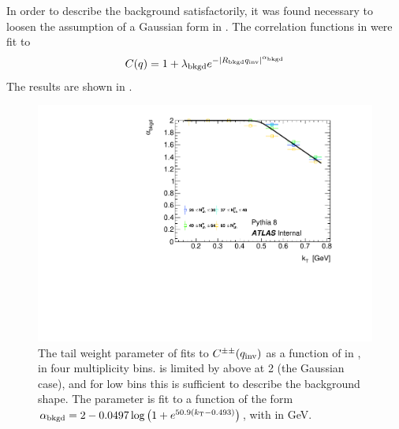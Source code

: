 In order to describe the background satisfactorily, it was found necessary to loosen the assumption of a Gaussian form in \qinv.
The \qinv correlation functions in  were fit to
\begin{equation} C(q) = 1 + \lambda_{\mathrm{bkgd}} e^{-|R_{\mathrm{bkgd}} q_{\mathrm{inv}}|^{\alpha_{\mathrm{bkgd}}}} \end{equation}
The results are shown in .

\begin{figure}[t]
\begin{minipage}[t]{1.0\textwidth}
\centering
\includegraphics{qinv_backAlpha_vs_kt_pythia8.pdf}
\end{minipage}
\caption{The tail weight parameter \abkgd of fits to $C^{\pm\pm}(q_{\mathrm{inv}})$ as a function of \kt in , in four multiplicity bins. \abkgd is limited by above at 2 (the Gaussian case), and for low \kt bins this is sufficient to describe the background shape. The parameter is fit to a function of the form $\alpha_{\mathrm{bkgd}} = 2 - 0.0497 \log \left(1 + e^{50.9(k_\mathrm{T} - 0.493)} \right)$, with \kt in GeV.
}
\label{fig:background_alpha_pythia8}
\end{figure}

